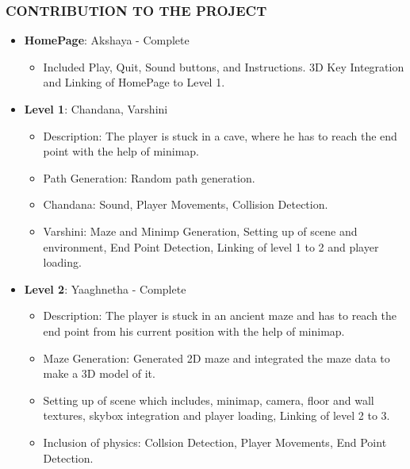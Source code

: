 \documentclass[9pt]{beamer}
\begin{document}
\begin{frame}
    \frametitle{CONTRIBUTION TO THE PROJECT}
    \begin{itemize}
        \item \textbf{HomePage}: Akshaya - Complete
            \begin{itemize}
                \item Included Play, Quit, Sound buttons, and Instructions. 3D Key Integration and Linking of HomePage to Level 1.
            \end{itemize}
        \vspace{0.5em}
        \item \textbf{Level 1}: Chandana, Varshini
            \begin{itemize}
                \item Description: The player is stuck in a cave, where he has to reach the end point with the help of minimap.
                \item Path Generation: Random path generation.
                \item Chandana: Sound, Player Movements, Collision Detection.
                \item Varshini: Maze and Minimp Generation, Setting up of scene and environment, End Point Detection, Linking of level 1 to 2 and player loading.
            \end{itemize}
            \vspace{0.5em}
        \item \textbf{Level 2}: Yaaghnetha - Complete
            \begin{itemize}
                \item Description: The player is stuck in an ancient maze and has to reach the end point from his current position with the help of minimap.
                \item Maze Generation: Generated 2D maze and integrated the maze data to make a 3D model of it.
                \item Setting up of scene which includes, minimap, camera, floor and wall textures, skybox integration and player loading, Linking of level 2 to 3.
                \item Inclusion of physics: Collsion Detection, Player Movements, End Point Detection.
            \end{itemize}
        \end{itemize}
\end{frame}
\end{document}
